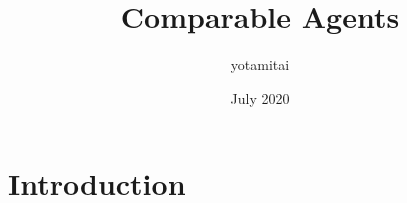 \documentclass{article}
\title{Comparable Agents}
\author{yotamitai }
\date{July 2020}
\begin{document}
\maketitle

\section{Introduction}
\end{document}
